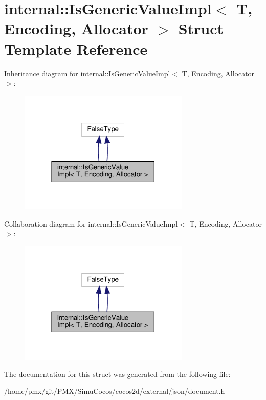 \hypertarget{structinternal_1_1IsGenericValueImpl}{}\section{internal\+:\+:Is\+Generic\+Value\+Impl$<$ T, Encoding, Allocator $>$ Struct Template Reference}
\label{structinternal_1_1IsGenericValueImpl}


Inheritance diagram for internal\+:\+:Is\+Generic\+Value\+Impl$<$ T, Encoding, Allocator $>$\+:
\nopagebreak
\begin{figure}[H]
\begin{center}
\leavevmode
\includegraphics[width=230pt]{structinternal_1_1IsGenericValueImpl__inherit__graph}
\end{center}
\end{figure}


Collaboration diagram for internal\+:\+:Is\+Generic\+Value\+Impl$<$ T, Encoding, Allocator $>$\+:
\nopagebreak
\begin{figure}[H]
\begin{center}
\leavevmode
\includegraphics[width=230pt]{structinternal_1_1IsGenericValueImpl__coll__graph}
\end{center}
\end{figure}


The documentation for this struct was generated from the following file\+:\begin{DoxyCompactItemize}
\item 
/home/pmx/git/\+P\+M\+X/\+Simu\+Cocos/cocos2d/external/json/document.\+h\end{DoxyCompactItemize}
